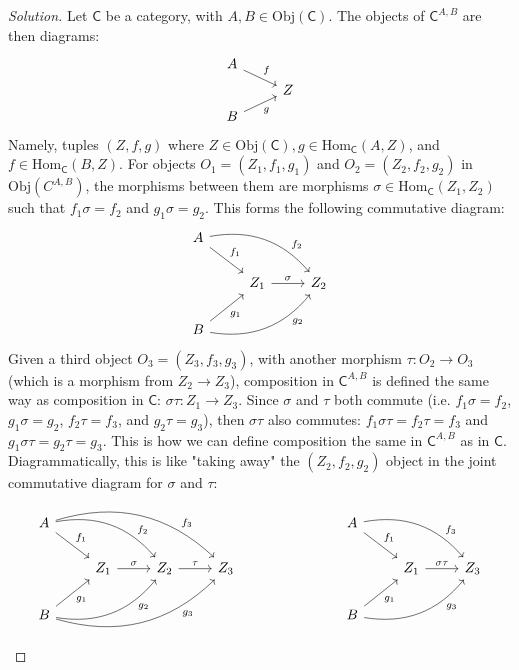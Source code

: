 \documentclass[fontsize=14pt]{scrartcl}
\theoremstyle{definition}
\newenvironment{solution}{
  \begin{proof}[Solution]
  \vspace{-8px}
  \setlength{\parskip}{4px}
  \setlength{\parindent}{0px}
}{
  \end{proof}
}
\newcommand{\Obj}{\mathrm{Obj}}
\newcommand{\Hom}{\mathrm{Hom}}
\begin{document}
\begin{solution}
\def \C {\mathsf{C}}

Let $\C$ be a category, with $A,B\in\Obj(\C)$. The objects of $\C^{A,B}$ are
then diagrams:
%
\[\begin{tikzcd}[row sep=tiny]
A \arrow[dr, "f"]  &   \\
                   & Z \\
B \arrow[ur, "g"'] & 
\end{tikzcd}\]
%
Namely, tuples $(Z,f,g)$ where $Z\in\Obj(\C),g\in\Hom_\C(A,Z)$, and
$f\in\Hom_\C(B,Z)$. For objects $O_1=(Z_1,f_1,g_1)$ and $O_2=(Z_2,f_2,g_2)$ in
$\Obj(C^{A,B})$, the morphisms between them are morphisms
$\sigma\in\Hom_\C(Z_1,Z_2)$ such that $f_1\sigma=f_2$ and $g_1\sigma=g_2$. This
forms the following commutative diagram:
%
\[\begin{tikzcd}
A \arrow[dr, "f_1"] \arrow[drr, bend left, "f_2" near end]    &                               \\
                                                     & Z_1 \arrow[r, "\sigma"] & Z_2 \\
B \arrow[ur, "g_1"'] \arrow[urr, bend right, "g_2"' near end] &
\end{tikzcd}\]
%
Given a third object $O_3=(Z_3,f_3,g_3)$, with another morphism $\tau:O_2\to
O_3$ (which is a morphism from $Z_2\to Z_3$), composition in $\C^{A,B}$ is
defined the same way as composition in $\C$: $\sigma\tau:Z_1\to Z_3$. Since
$\sigma$ and $\tau$ both commute (i.e.  $f_1\sigma=f_2$, $g_1\sigma=g_2$,
$f_2\tau=f_3$, and $g_2\tau=g_3$), then $\sigma\tau$ also commutes:
$f_1\sigma\tau=f_2\tau=f_3$ and $g_1\sigma\tau = g_2\tau = g_3$. This is how we
can define composition the same in $\C^{A,B}$ as in $\C$. Diagrammatically, this
is like "taking away" the $(Z_2,f_2,g_2)$ object in the joint commutative
diagram for $\sigma$ and $\tau$:
\[
\begin{tikzcd}
A \arrow[dr, "f_1"] \arrow[drr, bend left, "f_2" near end] \arrow[drrr, bend left, "f_3" near end] & & \\
  & Z_1 \arrow[r, "\sigma"] & Z_2 \arrow[r, "\tau"] & Z_3 \\
B \arrow[ur, "g_1"'] \arrow[urr, bend right, "g_2"' near end] \arrow[urrr, bend right, "g_3"' near end] & &
\end{tikzcd}
\hspace{1in}
\begin{tikzcd}
A \arrow[dr, "f_1"] \arrow[drr, bend left, "f_3" near end]    &                               \\
                                                     & Z_1 \arrow[r, "\sigma\tau"] & Z_3 \\
B \arrow[ur, "g_1"'] \arrow[urr, bend right, "g_3"' near end] &
\end{tikzcd}
\]
\end{solution}
\end{document}
